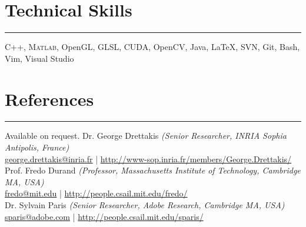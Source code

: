 \documentclass[10pt]{article}
\newcommand{\notes}[1]{\marginnote{\color{Gray}\small #1}}
\newcommand{\customsection}[1]{\section*{#1}\vspace{-0.2cm}\hrule\vspace{0.1cm}}
\begin{document}

\customsection{Technical Skills}
C++, {\scshape Matlab}, OpenGL, GLSL, CUDA, OpenCV, Java, \LaTeX, SVN, Git, Bash, Vim, Visual Studio

\customsection{References}
{%
Available on request.
}{%
Dr. George Drettakis {\itshape (Senior Researcher, INRIA Sophia Antipolis, France)} \\
\href{mailto:george.drettakis@inria.fr}{george.drettakis@inria.fr} |
\href{http://www-sop.inria.fr/members/George.Drettakis/}{http://www-sop.inria.fr/members/George.Drettakis/} \\[0.3cm]
%
Prof. Fredo Durand {\itshape (Professor, Massachusetts Institute of Technology, Cambridge MA, USA)} \\
\href{mailto:fredo@mit.edu}{fredo@mit.edu} |
\href{http://people.csail.mit.edu/fredo/}{http://people.csail.mit.edu/fredo/} \\[0.3cm]
%
Dr. Sylvain Paris {\itshape (Senior Researcher, Adobe Research, Cambridge MA, USA)} \\
\href{mailto:sparis@adobe.com}{sparis@adobe.com} |
\href{http://people.csail.mit.edu/sparis/}{http://people.csail.mit.edu/sparis/} \\[0.3cm]
}
\end{document}
